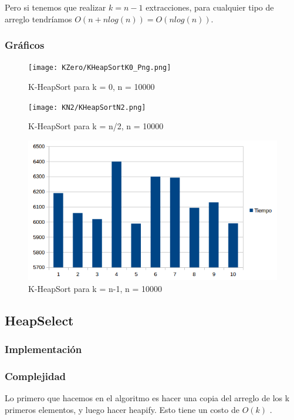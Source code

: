 Pero si tenemos que realizar $k = n-1$ extracciones, para cualquier tipo de arreglo tendríamos $O(n + nlog(n)) = O(nlog(n)) $.

\subsubsection{Gráficos}
\begin{figure}[H]
\centering
\texttt{[image: KZero/KHeapSortK0\_Png.png]}
\caption{K-HeapSort para k = 0, n = 10000}
\end{figure}

\begin{figure}[H]
\centering
\texttt{[image: KN2/KHeapSortN2.png]}
\caption{K-HeapSort para k = n/2, n = 10000}
\end{figure}

\begin{figure}[H]
\centering
\includegraphics[width=\textwidth]{KN/KHeapSortN.png}
\caption{K-HeapSort para k = n-1, n = 10000}
\end{figure}


\newpage

\subsection{HeapSelect}
\subsubsection{Implementación}

\subsubsection{Complejidad}
Lo primero que hacemos en el algoritmo es hacer una copia del arreglo de los k primeros elementos, y luego hacer heapify. Esto tiene un costo de $O(k)$ \cite{STD_MAKEHEAP}.

